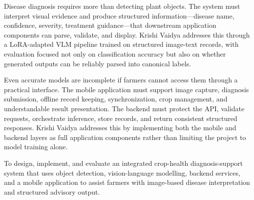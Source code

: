 
Disease diagnosis requires more than detecting plant objects. The system must interpret visual
evidence and produce structured information---disease name, confidence, severity, treatment
guidance---that downstream application components can parse, validate, and display. Krishi
Vaidya addresses this through a LoRA-adapted VLM pipeline trained on structured image-text
records, with evaluation focused not only on classification accuracy but also on whether
generated outputs can be reliably parsed into canonical labels.


Even accurate models are incomplete if farmers cannot access them through a practical interface.
The mobile application must support image capture, diagnosis submission, offline record keeping,
synchronization, crop management, and understandable result presentation. The backend must
protect the API, validate requests, orchestrate inference, store records, and return consistent
structured responses. Krishi Vaidya addresses this by implementing both the mobile and backend
layers as full application components rather than limiting the project to model training alone.



To design, implement, and evaluate an integrated crop-health diagnosis-support system that uses
object detection, vision-language modelling, backend services, and a mobile application to
assist farmers with image-based disease interpretation and structured advisory output.


